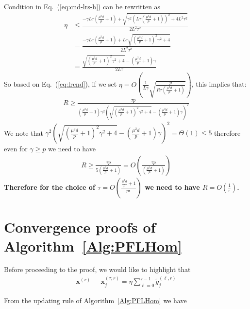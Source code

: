 \begin{remark}\label{rmk:cnd-lr}

Condition in Eq.~(\ref{eq:cnd-lrs-h}) can be rewritten as 
\begin{align}
    \eta&\leq \frac{-\gamma L\tau\left(\frac{\mu^2 d}{p}+1\right)+\sqrt{\gamma^2 \left(L\tau\left(\frac{\mu^2 d}{p}+1\right)\right)^2+4L^2\tau^2}}{2L^2\tau^2}\nonumber\\
    &= \frac{-\gamma L\tau\left(\frac{\mu^2 d}{p}+1\right)+L\tau\sqrt{\left(\frac{\mu^2 d}{p}+1\right)^2\gamma^2 +4}}{2L^2\tau^2}\nonumber\\
    &=\frac{\sqrt{\left(\frac{\mu^2 d}{p}+1\right)^2\gamma^2 +4}-\left(\frac{\mu^2 d}{p}+1\right)\gamma}{2L\tau}\label{eq:lrcnd}
\end{align}
So based on Eq.~(\ref{eq:lrcnd}), if we set $\eta=O\left(\frac{1}{L\gamma}\sqrt{\frac{p}{R\tau\left(\frac{\mu^2 d}{p}+1\right)}}\right)$, this implies that:
\begin{align}
    R\geq \frac{\tau p}{\left(\frac{\mu^2 d}{p}+1\right)\gamma^2\left(\sqrt{\left(\frac{\mu^2 d}{p}+1\right)^2\gamma^2+4}-\left(\frac{\mu^2 d}{p}+1\right)\gamma\right)^2}\label{eq:iidexact}
\end{align}
We note that $\gamma^2\left(\sqrt{\left(\frac{\mu^2 d}{p}+1\right)^2\gamma^2+4}-\left(\frac{\mu^2 d}{p}+1\right)\gamma\right)^2=\Theta(1)\leq 5 $ therefore even for $\gamma\geq p$ we need to have 
\begin{align}
    R\geq \frac{\tau p}{5\left(\frac{\mu^2 d}{p}+1\right)}=O\left(\frac{\tau p}{\left(\frac{\mu^2 d}{p}+1\right)}\right)
\end{align}
\textbf{Therefore for the choice of $\tau=O\left(\frac{\frac{\mu^2 d}{p}+1}{p\epsilon}\right)$ we need to have $R=O\left(\frac{1}{\epsilon}\right)$.}
\end{remark}



\section{Convergence proofs of Algorithm~\ref{Alg:PFLHom}}

Before proceeding to the proof, we would like to highlight that 
\begin{align}
    \boldsymbol{x}^{(r)}- ~{\boldsymbol{x}}_{j}^{(\tau,r)}=\eta\sum_{\ell=0}^{\tau-1}\tilde{g}_j^{(\ell,r)}\label{eq:decent-smoothe}
\end{align}

From the updating rule of Algorithm~\ref{Alg:PFLHom} we have


